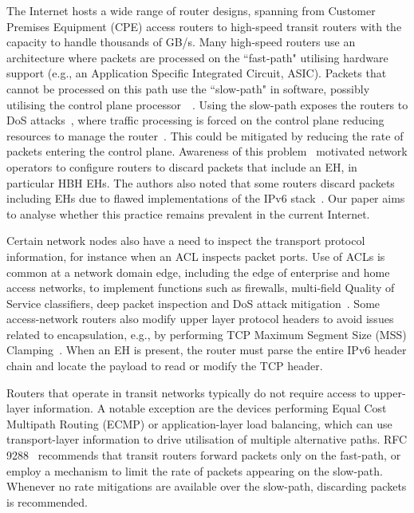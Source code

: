 \documentclass[conference]{IEEEtran}
\begin{document}
The Internet hosts a wide range of router designs, spanning from Customer
Premises Equipment (CPE) access routers to high-speed transit routers with the
capacity to handle thousands of GB/s.  Many high-speed routers use an
architecture where packets are processed on the ``fast-path" utilising hardware
support (e.g., an Application Specific Integrated Circuit, ASIC). Packets that
cannot be processed on this path use the ``slow-path" in software, possibly
utilising the control plane processor~\cite{RFC3654}~\cite{ietf-v6ops-hbh-03}.
Using the slow-path exposes the routers to DoS
attacks~\cite{naagas2021deh}, where traffic processing is forced on the control
plane reducing resources to manage the router~\cite{router-architecture}. This
could be mitigated  by reducing the rate of packets entering the control plane.
Awareness of this problem~\cite{passive-threats} motivated network
operators to configure routers to discard packets that include an EH, in
particular HBH EHs. The authors also noted that some routers discard packets
including EHs due to flawed implementations of the IPv6
stack~\cite{passive-threats}.  Our paper aims to analyse whether this practice
remains prevalent in the current Internet.

Certain network nodes also have a need to inspect the transport protocol
information, for instance when an ACL inspects packet ports.
Use of ACLs is common at a network domain edge, including the edge of enterprise
and home access networks, to implement functions such as firewalls, multi-field Quality of Service
classifiers, deep packet inspection and DoS attack
mitigation~\cite{lb-classification}. Some access-network routers also modify
upper layer protocol headers to avoid issues related to encapsulation, e.g.,
by performing TCP Maximum Segment Size (MSS) Clamping~\cite{custura-mtu}. When
an EH is present, the router must parse the entire IPv6 header
chain and locate the payload to read or modify the TCP header. 

Routers that operate in transit networks typically do not require access to
upper-layer information. A notable exception are the devices performing Equal
Cost Multipath Routing (ECMP) or application-layer load balancing, which can use
transport-layer information to drive utilisation of multiple alternative
paths. RFC 9288~\cite{rfc9288} recommends that transit routers forward packets
only on the fast-path, or employ a mechanism to limit the rate of packets
appearing on the slow-path.  Whenever no rate mitigations are available over
the slow-path, discarding packets is recommended. 
\end{document}

